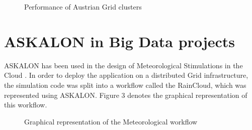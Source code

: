 \documentclass[9pt,twocolumn,twoside]{../../styles/osajnl}
\begin{document}
\begin{figure}[htbp]
  \centering
  \caption{Performance of Austrian Grid clusters \cite{Austrian-grid}}
\end{figure}

\section{ASKALON in Big Data projects}
ASKALON has been used in the design of Meteorological Stimulations in
the Cloud \cite{ASKALON-Big-data-project}.  In order to deploy the
application on a distributed Grid infrastructure, the simulation code
was split into a workflow called the RainCloud, which was represented
using ASKALON.  Figure 3 denotes the graphical representation of this
workflow.

\begin{figure}[htbp]
  \centering
  \caption{Graphical representation of the Meteorological workflow \cite{ASKALON-Big-data-project}}
\end{figure}
\end{document}
